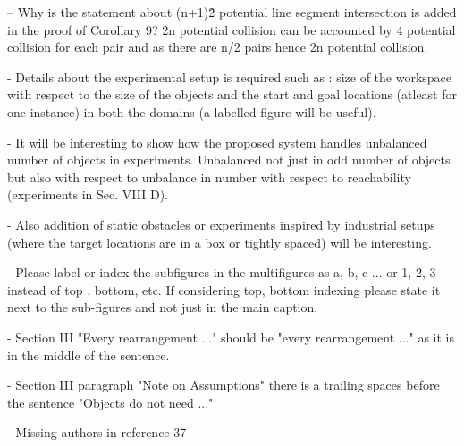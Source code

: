 \documentclass[journal]{IEEEtran}
\begin{document}
	\begin{partt}
		-- Why is the statement about (n+1)\^2 potential line segment intersection is added in the proof of Corollary 9? 2n potential collision can be accounted by 4 potential collision for each pair and as there are n/2 pairs hence 2n potential collision.
	\end{partt}
	\begin{partt}
		
		- Details about the experimental setup is required such as : size of the workspace with respect to the size of the objects and the start and goal locations (atleast for one instance) in both the domains (a labelled figure will be useful). 
	\end{partt}
	\begin{partt} 
		
		- It will be interesting to show how the proposed system handles unbalanced number of objects in experiments. Unbalanced not just in odd number of objects but also with respect to unbalance in number with respect to reachability (experiments in Sec. VIII D).
	\end{partt}
	\begin{partt}
		
		- Also addition of static obstacles or experiments inspired by industrial setups (where the target locations are in a box or tightly spaced) will be interesting.
	\end{partt}
	\begin{partt}
		
		- Please label or index the subfigures in the multifigures as a, b, c ... or 1, 2, 3 instead of top , bottom, etc. If considering top, bottom indexing please state it next to the sub-figures and not just in the main caption.
	\end{partt}
	\begin{partt}
		
		- Section III "Every rearrangement ..." should be "every rearrangement ..." as it is in the middle of the sentence.
	\end{partt}
	\begin{partt}
		
		- Section III paragraph "Note on Assumptions" there is a trailing spaces before the sentence  "Objects do not need ..."
	\end{partt}
	\begin{partt}
		
		- Missing authors in reference 37
	\end{partt}
\end{document}
